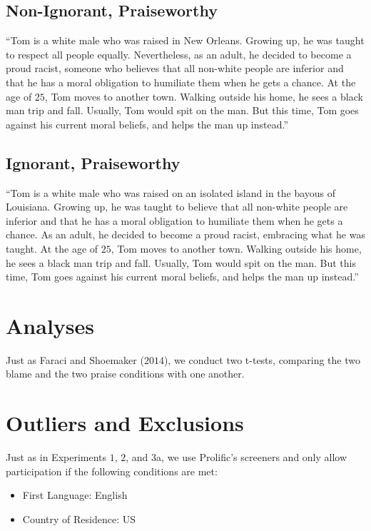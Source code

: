 \documentclass[scrarticle]{scrartcl}
\begin{document}
\subsection*{Non-Ignorant, Praiseworthy}
\enquote{Tom is a white male who was raised in New Orleans.
Growing up, he was taught to respect all people equally.
Nevertheless, as an adult, he decided to become a proud racist, someone who believes that all non-white people are inferior and that he has a moral obligation to humiliate them when he gets a chance.
At the age of $25$, Tom moves to another town.
Walking outside his home, he sees a black man trip and fall.
Usually, Tom would spit on the man.
But this time, Tom goes against his current moral beliefs, and helps the man up instead.}


\subsection*{Ignorant, Praiseworthy}
\enquote{Tom is a white male who was raised on an isolated island in the bayous of Louisiana.
Growing up, he was taught to believe that all non-white people are inferior and that he has a moral obligation to humiliate them when he gets a chance.
As an adult, he decided to become a proud racist, embracing what he was taught.
At the age of $25$, Tom moves to another town.
Walking outside his home, he sees a black man trip and fall.
Usually, Tom would spit on the man.
But this time, Tom goes against his current moral beliefs, and helps the man up instead.}


\section{Analyses}
Just as Faraci and Shoemaker ($2014$), we conduct two t-tests, comparing the two blame and the two praise conditions with one another.


\section{Outliers and Exclusions}
Just as in Experiments $1$, $2$, and $3$a, we use Prolific's screeners and only allow participation if the following conditions are met:

\begin{itemize}[noitemsep]
   \item[--] First Language: English
   \item[--] Country of Residence: US
\end{itemize}
\end{document}
